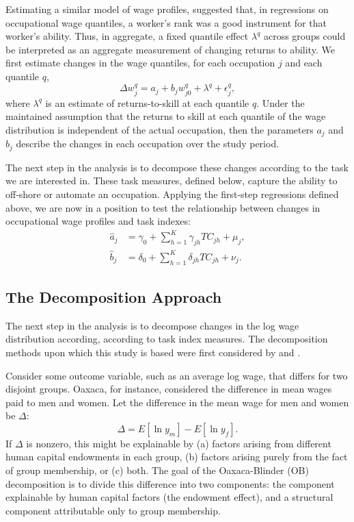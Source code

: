 Estimating a similar model of wage profiles, \citet{Juhn1993} suggested that, in regressions on occupational wage quantiles, a worker's rank was a good instrument for that worker's ability. Thus, in aggregate, a fixed quantile effect $\lambda^q$ across groups could be interpreted as an aggregate measurement of changing returns to ability. We first estimate changes in the wage quantiles, for each occupation $j$ and each quantile $q$,
\begin{equation} 
  \Delta w_j^q = a_j + b_jw_{j0}^q + \lambda^q + \epsilon^q_j, 
\end{equation}
where $\lambda^q$ is an estimate of returns-to-skill at each quantile $q$. Under the maintained assumption that the returns to skill at each quantile of the wage distribution is independent of the actual occupation, then the parameters $a_j$ and $b_j$ describe the changes in each occupation over the study period.

The next step in the analysis is to decompose these changes according to the task we are interested in. These task measures, defined below, capture the ability to off-shore or automate an occupation. Applying the first-step regressions defined above, we are now in a position to test the relationship between changes in occupational wage profiles and task indexes:
\begin{align}
  \hat{a}_j &= \gamma_0 + \sum_{h=1}^K\gamma_{jh}TC_{jh} + \mu_j, \\
  \hat{b}_j &= \delta_0 + \sum_{h=1}^K\delta_{jh}TC_{jh} + \nu_j.
\end{align}
\subsection{The Decomposition Approach}
The next step in the analysis is to decompose changes in the log wage distribution according, according to task index measures. The decomposition methods upon which this study is based were first considered by \citet{Oaxaca1973} and \citet{Blinder1973}. 

Consider some outcome variable, such as an average log wage, that differs for two disjoint groups. Oaxaca, for instance, considered the difference in mean wages paid to men and women. Let the difference in the mean wage for men and women be $\Delta$:
\begin{equation} \Delta = E[\ln y_m] - E[\ln y_f]. \label{eq:odec} \end{equation}
If $\Delta$ is nonzero, this might be explainable by (a) factors arising from different human capital endowments in each group, (b) factors arising purely from the fact of group membership, or (c) both. The goal of the Oaxaca-Blinder (OB) decomposition is to divide this difference into two components: the component explainable by human capital factors (the endowment effect), and a structural component attributable only to group membership.

